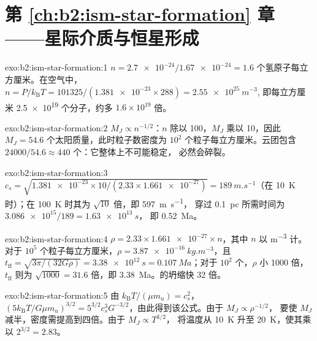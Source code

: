 \section*{第 \ref{ch:b2:ism-star-formation} 章——星际介质与恒星形成}

\begin{solution}{exo:b2:ism-star-formation:1}
$n = \num{2.7e-24}/\num{1.67e-24} = 1.6$ 个氢原子每立方厘米。在空气中，
$n = P/k_{\mathrm B}T = 101325/(\num{1.381e-23}\times288) = \qty{2.55e25}{m^{-3}}$,
即每立方厘米 \num{2.5e19} 个分子，约多
$1.6\times10^{19}$ 倍。
\end{solution}

\begin{solution}{exo:b2:ism-star-formation:2}
$M_J \propto n^{-1/2}$：$n$ 除以 100，$M_J$ 乘以 10，因此
$M_J = 54.6$ 个太阳质量，此时粒子数密度为 $10^2$ 个粒子每立方厘米。云团包含
$\num{24000}/54.6 \approx 440$ 个：它整体上不可能稳定，
必然会碎裂。
\end{solution}

\begin{solution}{exo:b2:ism-star-formation:3}
$c_s = \sqrt{\num{1.381e-23}\times10/(2.33\times\num{1.661e-27})} =
\qty{189}{m.s^{-1}}$（在 \qty{10}{K} 时）；在 \qty{100}{K} 时其为 $\sqrt{10}$ 倍，即 \qty{597}{m.s^{-1}}，
穿过 \qty{0.1}{pc} 所需时间为 $\num{3.086e15}/189 = \qty{1.63e13}{s}$，
即 \qty{0.52}{Ma}。
\end{solution}

\begin{solution}{exo:b2:ism-star-formation:4}
$\rho = 2.33\times\num{1.661e-27}\times n$，其中 $n$ 以 \unit{m^{-3}} 计。对于 $10^5$
个粒子每立方厘米，$\rho = \qty{3.87e-16}{kg.m^{-3}}$，且
$t_{\mathrm{ff}} = \sqrt{3\pi/(32G\rho)} = \qty{3.38e12}{s} = \qty{0.107}{Ma}$；对于
$10^2$ 个，$\rho$ 小 \num{1000} 倍，$t_{\mathrm{ff}}$ 则为 $\sqrt{1000} = 31.6$
倍，即 \qty{3.38}{Ma}。的坍缩快 32 倍。
\end{solution}

\begin{solution}{exo:b2:ism-star-formation:5}
由 $k_{\mathrm B}T/(\mu m_u) = c_s^2$，$(5k_{\mathrm B}T/G\mu m_u)^{3/2} =
5^{3/2}c_s^3G^{-3/2}$，由此得到该公式。由于 $M_J \propto \rho^{-1/2}$，
要使 $M_J$ 减半，密度需提高到四倍。由于 $M_J \propto T^{3/2}$，
将温度从 \qty{10}{K} 升至 \qty{20}{K}，使其乘以 $2^{3/2} = 2.83$。
\end{solution}

